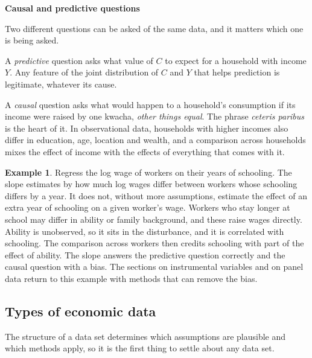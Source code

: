 \documentclass[11pt,a4paper]{article}
\numberwithin{equation}{section}
\theoremstyle{definition}
\newtheorem{exa}[thm]{Example}
\newcommand{\subhead}[1]{%
  \par\medskip\noindent\textbf{#1}\par\nobreak\smallskip}
\begin{document}
\subhead{Causal and predictive questions}
Two different questions can be asked of the same data, and it matters which one is being asked.

A \emph{predictive} question asks what value of $C$ to expect for a household with income $Y$. Any feature of the joint distribution of $C$ and
$Y$ that helps prediction is legitimate, whatever its cause.

A \emph{causal} question asks what would happen to a household's consumption if its income were raised by one kwacha, \emph{other things
equal}. The phrase \emph{ceteris paribus} is the heart of it. In observational data, households with higher incomes also differ in education,
age, location and wealth, and a comparison across households mixes the effect of income with the effects of everything that comes with it.

\begin{exa}
\label{ex:wages}
Regress the log wage of workers on their years of schooling. The slope estimates by how much log wages differ between workers whose schooling
differs by a year. It does not, without more assumptions, estimate the effect of an extra year of schooling on a given worker's wage. Workers
who stay longer at school may differ in ability or family background, and these raise wages directly. Ability is unobserved, so it sits in the
disturbance, and it is correlated with schooling. The comparison across workers then credits schooling with part of the effect of ability. The
slope answers the predictive question correctly and the causal question with a bias. The sections on instrumental variables and on panel data return to this
example with methods that can remove the bias.
\end{exa}

\subsection{Types of economic data}
\label{ssec:data}

The structure of a data set determines which assumptions are plausible and which methods apply, so it is the first thing to settle about
any data set.
\end{document}
